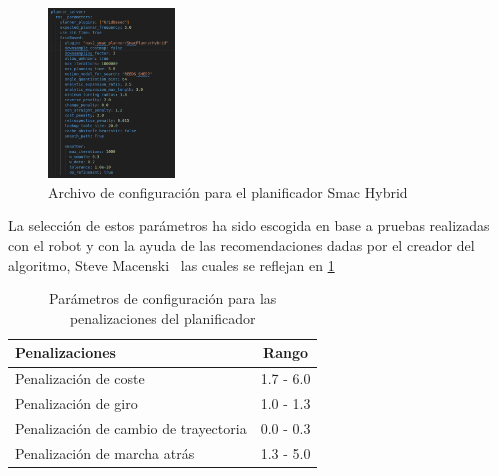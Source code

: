 \begin{figure}[H]
    \centering
    \includegraphics[width=0.3\textwidth]{images/configuracion_planner.png}
    \caption{Archivo de configuración para el planificador Smac Hybrid}
    \label{fig:configuracion_planner}
\end{figure}

La selección de estos parámetros ha sido escogida en base a pruebas realizadas con el robot y con la ayuda de las recomendaciones dadas 
por el creador del algoritmo, Steve Macenski~\cite{steve_mc} las cuales se reflejan en \ref{tab:parametros_planificador_steve}

\begin{table}[h!]
    \centering
    \caption{Parámetros de configuración para las penalizaciones del planificador}
    \begin{tabular}{|l|c|}
        \hline
        Penalizaciones     & Rango      \\ \hline
        Penalización de coste          & 1.7 - 6.0  \\ \hline
        Penalización de giro  & 1.0 - 1.3  \\ \hline
        Penalización de cambio de trayectoria        & 0.0 - 0.3  \\ \hline
        Penalización de marcha atrás       & 1.3 - 5.0  \\ \hline
    \end{tabular}
    \label{tab:parametros_planificador_steve}
\end{table}

